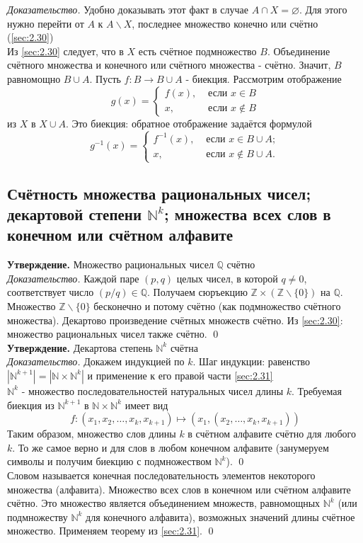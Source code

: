 \documentclass[a4paper]{article}
\begin{document}
\textit{Доказательство.} Удобно доказывать этот факт в случае $A \cap X=\varnothing$. Для этого нужно перейти от $A$ к $A \backslash X$, последнее множество конечно или счётно (\ref{sec:2.30})\\[2mm]
 Из \ref{sec:2.30} следует, что в $X$ есть счётное подмножество $B$. Объединение счётного множества и конечного или счётного множества - счётно. Значит, $B$ равномощно $B \cup A$. Пусть $f: B \rightarrow B \cup A$ - биекция. Рассмотрим отображение
$$
g(x)= \begin{cases}f(x), & \text { если } x \in B \\ x, & \text { если } x \notin B\end{cases}
$$
из $X$ в $X \cup A$. Это биекция: обратное отображение задаётся формулой
$$
g^{-1}(x)= \begin{cases}f^{-1}(x), & \text { если } x \in B \cup A ; \\ x, & \text { если } x \notin B \cup A .\end{cases}
$$\label{sec:2.31}
\subsection{Счётность множества рациональных чисел; декартовой степени $\mathbb{N}^k$; множества всех слов в конечном или счётном алфавите}
\textbf{Утверждение.} Множество рациональных чисел $\mathbb{Q}$ счётно\\[2mm]
\textit{Доказательство.} Каждой паре $(p, q)$ целых чисел, в которой $q \neq 0$, соответствует число $(p / q)\in\mathbb{Q}$. Получаем сюръекцию $\mathbb{Z} \times(\mathbb{Z} \backslash\{0\})$ на $\mathbb{Q}$. Множество $\mathbb{Z} \backslash\{0\}$ бесконечно и потому счётно (как подмножество счётного множества). Декартово произведение счётных множеств счётно. Из \ref{sec:2.30}: множество рациональных чисел также счётно. \qed\\[2mm]
\textbf{Утверждение.} Декартова степень $\mathbb{N}^{k}$ счётна\\[2mm]
\textit{Доказательство.} Докажем индукцией по $k$. Шаг индукции: равенство $\left|\mathbb{N}^{k+1}\right|=\left|\mathbb{N} \times \mathbb{N}^{k}\right|$ и применение к его правой части \ref{sec:2.31}\\[2mm]
 $\mathbb{N}^{k}$ - множество последовательностей натуральных чисел длины $k$. Требуемая биекция из $\mathbb{N}^{k+1}$ в $\mathbb{N} \times \mathbb{N}^{k}$ имеет вид
$$
f:\left(x_{1}, x_{2}, \ldots, x_{k}, x_{k+1}\right) \mapsto\left(x_{1},\left(x_{2}, \ldots, x_{k}, x_{k+1}\right)\right)
$$
 Таким образом, множество слов длины $k$ в счётном алфавите счётно для любого $k$. То же самое верно и для слов в любом конечном алфавите (занумеруем символы и получим биекцию с подмножеством $\mathbb{N}^{k}$). \qed\\[2mm]
 Словом называется конечная последовательность элементов некоторого множества (алфавита). Множество всех слов в конечном или счётном алфавите счётно. Это множество является объединением множеств, равномощных $\mathbb{N}^{k}$ (или подмножеству $\mathbb{N}^{k}$ для конечного алфавита), возможных значений длины счётное множество. Применяем теорему из \ref{sec:2.31}. \qed
\end{document}
